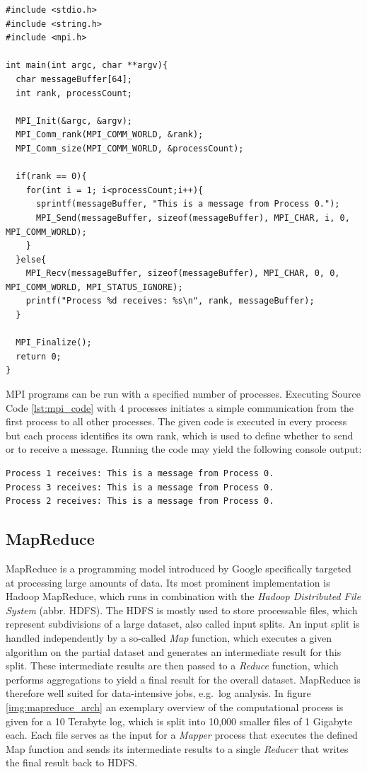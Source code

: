 \begin{lstlisting}[caption=MPI Code Example in C,captionpos=b,label=lst:mpi_code]
#include <stdio.h>
#include <string.h>
#include <mpi.h>

int main(int argc, char **argv){
  char messageBuffer[64];
  int rank, processCount;

  MPI_Init(&argc, &argv);
  MPI_Comm_rank(MPI_COMM_WORLD, &rank);
  MPI_Comm_size(MPI_COMM_WORLD, &processCount);

  if(rank == 0){
    for(int i = 1; i<processCount;i++){
      sprintf(messageBuffer, "This is a message from Process 0.");
      MPI_Send(messageBuffer, sizeof(messageBuffer), MPI_CHAR, i, 0, MPI_COMM_WORLD);
    }
  }else{
    MPI_Recv(messageBuffer, sizeof(messageBuffer), MPI_CHAR, 0, 0, MPI_COMM_WORLD, MPI_STATUS_IGNORE);
    printf("Process %d receives: %s\n", rank, messageBuffer);
  }

  MPI_Finalize();
  return 0;
}
\end{lstlisting}

MPI programs can be run with a specified number of processes. Executing Source Code \ref{lst:mpi_code} with 4 processes initiates a simple communication from the first process to all other processes. The given code is executed in every process but each process identifies its own rank, which is used to define whether to send or to receive a message. Running the code may yield the following console output:
\begin{Verbatim}[fontsize=\small]
Process 1 receives: This is a message from Process 0.
Process 3 receives: This is a message from Process 0.
Process 2 receives: This is a message from Process 0.
\end{Verbatim}

\subsection*{MapReduce}
MapReduce is a programming model introduced by Google specifically targeted at processing large amounts of data\cite{mapreduce}. Its most prominent implementation is Hadoop MapReduce, which runs in combination with the \textit{Hadoop Distributed File System} (abbr. HDFS)\cite{hadoop_mapreduce}. The HDFS is mostly used to store processable files, which represent subdivisions of a large dataset, also called input splits. An input split is handled independently by a so-called \textit{Map} function, which executes a given algorithm on the partial dataset and generates an intermediate result for this split. These intermediate results are then passed to a \textit{Reduce} function, which performs aggregations to yield a final result for the overall dataset. MapReduce is therefore well suited for data-intensive jobs, e.g.~log analysis. In figure \ref{img:mapreduce_arch} an exemplary overview of the computational process is given for a 10 Terabyte log, which is split into 10,000 smaller files of 1 Gigabyte each. Each file serves as the input for a \textit{Mapper} process that executes the defined Map function and sends its intermediate results to a single \textit{Reducer} that writes the final result back to HDFS.

